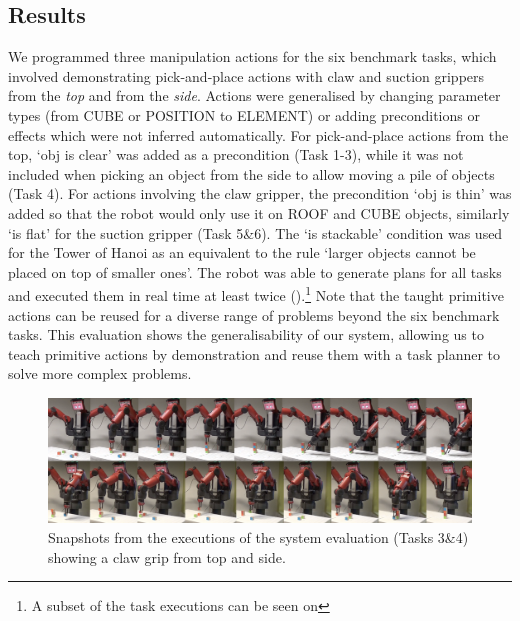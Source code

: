 \subsection{Results}
We programmed three manipulation actions for the six benchmark tasks, which involved demonstrating pick-and-place actions with claw and suction grippers from the \textit{top} and from the \textit{side}.
Actions were generalised by changing parameter types (\eg from CUBE or POSITION to ELEMENT) or adding preconditions or effects which were not inferred automatically.
For pick-and-place actions from the top, `obj is clear' was added as a precondition (Task 1-3), while it was not included when picking an object from the side to allow moving a pile of objects (Task 4).
For actions involving the claw gripper, the precondition `obj is thin' was added so that the robot would only use it on ROOF and CUBE objects, similarly `is flat' for the suction gripper (Task 5\&6).
The `is stackable' condition was used for the Tower of Hanoi as an equivalent to the rule `larger objects cannot be placed on top of smaller ones'.
The robot was able to generate plans for all tasks and executed them in real time at least twice ().\footnote{A subset of the task executions can be seen on \todo{}}
Note that the taught primitive actions can be reused for a diverse range of problems beyond the six benchmark tasks.
This evaluation shows the generalisability of our system, allowing us to teach primitive actions by demonstration and reuse them with a task planner to solve more complex problems.

\begin{figure}[h]
	\centering
	\includegraphics[width=\linewidth]{figures/filmstrip.png}
	\caption{Snapshots from the executions of the system evaluation (Tasks 3\&4) showing a claw grip from top and side.}
	\label{fig:filmstrip}
\end{figure}